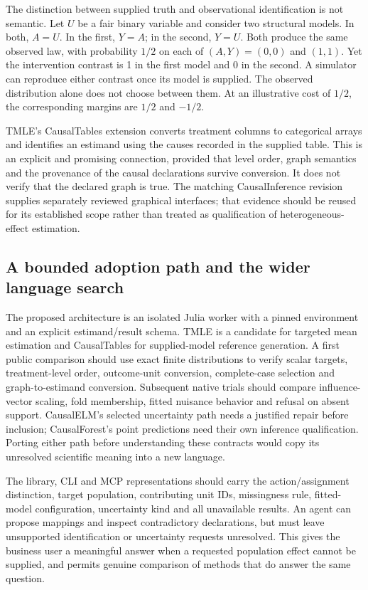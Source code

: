 The distinction between supplied truth and observational identification is
not semantic. Let $U$ be a fair binary variable and consider two structural
models. In both, $A=U$. In the first, $Y=A$; in the second, $Y=U$. Both
produce the same observed law, with probability $1/2$ on each of
$(A,Y)=(0,0)$ and $(1,1)$. Yet the intervention contrast is 1 in the first
model and 0 in the second. A simulator can reproduce either contrast once
its model is supplied. The observed distribution alone does not choose
between them. At an illustrative cost of $1/2$, the corresponding margins
are $1/2$ and $-1/2$. \cite{exec21_effects_reference}

TMLE's CausalTables extension converts treatment columns to categorical
arrays and identifies an estimand using the causes recorded in the supplied
table. This is an explicit and promising connection, provided that level
order, graph semantics and the provenance of the causal declarations survive
conversion. It does not verify that the declared graph is true. The
matching CausalInference revision supplies separately reviewed graphical
interfaces; that evidence should be reused for its established scope rather
than treated as qualification of heterogeneous-effect estimation.
\cite{exec21_effects_tmle,exec19_otherid_julia}

\subsection{A bounded adoption path and the wider language search}
\label{exec21:effects-integration}

The proposed architecture is an isolated Julia worker with a pinned
environment and an explicit estimand/result schema. TMLE is a candidate for
targeted mean estimation and CausalTables for supplied-model reference
generation. A first public comparison should use exact finite distributions
to verify scalar targets, treatment-level order, outcome-unit conversion,
complete-case selection and graph-to-estimand conversion. Subsequent native
trials should compare influence-vector scaling, fold membership, fitted
nuisance behavior and refusal on absent support. CausalELM's selected
uncertainty path needs a justified repair before inclusion; CausalForest's
point predictions need their own inference qualification. Porting either
path before understanding these contracts would copy its unresolved
scientific meaning into a new language.

The library, CLI and MCP representations should carry the action/assignment
distinction, target population, contributing unit IDs, missingness rule,
fitted-model configuration, uncertainty kind and all unavailable results.
An agent can propose mappings and inspect contradictory declarations, but
must leave unsupported identification or uncertainty requests unresolved.
This gives the business user a meaningful answer when a requested population
effect cannot be supplied, and permits genuine comparison of methods that
do answer the same question.

